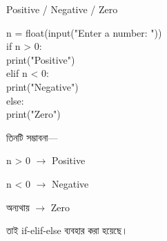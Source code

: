 
\begin{codeoutputbox}{Positive / Negative / Zero}

\noindent
\begin{minipage}[t]{0.54\linewidth}
\codeheading

\begin{english}
\ttfamily
n = float(input("Enter a number: "))\\[0.5mm]
if n > 0:\\
\hspace*{4mm}print("Positive")\\
elif n < 0:\\
\hspace*{4mm}print("Negative")\\
else:\\
\hspace*{4mm}print("Zero")
\end{english}

\end{minipage}
\hfill
\begin{minipage}[t]{0.42\linewidth}
\outputheading

তিনটি সম্ভাবনা—

\medskip

\textenglish{\ttfamily n > 0}
\(\rightarrow\)
Positive

\medskip

\textenglish{\ttfamily n < 0}
\(\rightarrow\)
Negative

\medskip

অন্যথায়
\(\rightarrow\)
Zero

\medskip

তাই
\textenglish{\ttfamily if-elif-else}
ব্যবহার করা হয়েছে।

\end{minipage}

\end{codeoutputbox}



